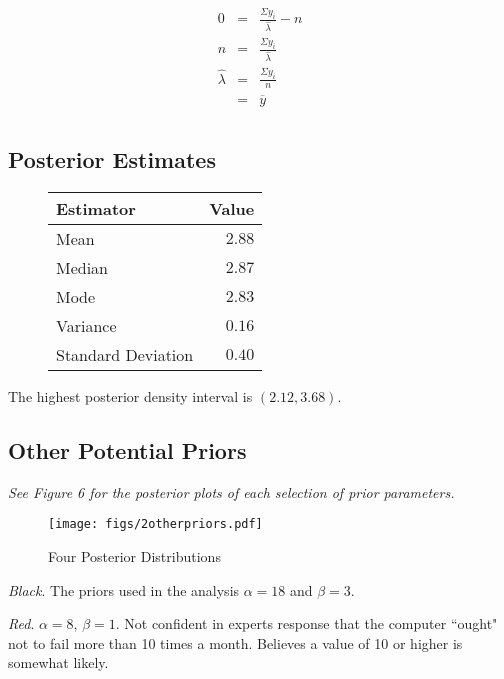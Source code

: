 \documentclass[12pt]{article}
\newcommand{\ybar}{\overline{y}}
\begin{document}
\begin{eqnarray*}
0 &=& \frac{\Sigma y_i}{\hat{\lambda}}-n \\
n &=& \frac{\Sigma y_i}{\hat{\lambda}} \\
\hat{\lambda} &=& \frac{\Sigma y_i}{n} \\
&=& \ybar \\
\end{eqnarray*}

\subsection{Posterior Estimates}

\begin{figure}[H]
\begin{center}
\begin{tabular}{l|r}
Estimator & \multicolumn{1}{l}{Value} \\ \hline \hline
Mean               & $2.88$ \\
Median             & $2.87$ \\
Mode               & $2.83$ \\
Variance           & $0.16$ \\
Standard Deviation & $0.40$ \\
\end{tabular}
\end{center}
\end{figure}

\noindent The highest posterior density interval is $(2.12, 3.68)$.

\subsection{Other Potential Priors}

\noindent \textit{See Figure 6 for the posterior plots of each selection of prior parameters.}
\bigskip

\begin{figure}
\begin{center}
\texttt{[image: figs/2otherpriors.pdf]}
\caption{Four Posterior Distributions}
\end{center}
\end{figure}

\noindent \textit{Black}.  The priors used in the analysis $\alpha=18$ and $\beta=3$.

\noindent \textit{Red}. $\alpha=8$, $\beta=1$.  Not confident in experts response that the computer ``ought" not to fail more than 10 times a month.  Believes a value of 10 or higher is somewhat likely.
\end{document}
